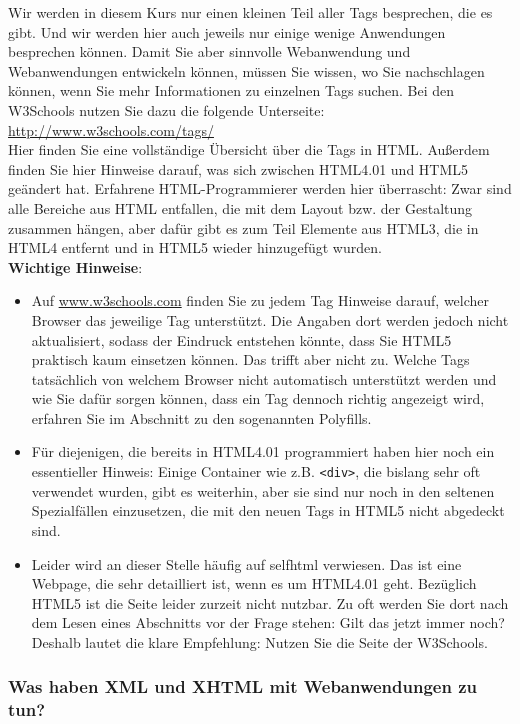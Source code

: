 Wir werden in diesem Kurs nur einen kleinen Teil aller Tags besprechen, die es gibt. Und wir werden hier auch jeweils nur einige wenige Anwendungen besprechen können. Damit Sie aber sinnvolle Webanwendung und Webanwendungen entwickeln können, müssen Sie wissen, wo Sie nachschlagen können, wenn Sie mehr Informationen zu einzelnen Tags suchen. Bei den W3Schools nutzen Sie dazu die folgende Unterseite: \url{http://www.w3schools.com/tags/}\\

Hier finden Sie eine vollständige Übersicht über die Tags in HTML. Außerdem finden Sie hier Hinweise darauf, was sich zwischen HTML4.01 und HTML5 geändert hat. Erfahrene HTML-Programmierer werden hier überrascht: Zwar sind alle Bereiche aus HTML entfallen, die mit dem Layout bzw. der Gestaltung zusammen hängen, aber dafür gibt es zum Teil Elemente aus HTML3, die in HTML4 entfernt und in HTML5 wieder hinzugefügt wurden.\\

\textbf{Wichtige Hinweise}:

\begin{itemize}
	\item Auf \url{www.w3schools.com} finden Sie zu jedem Tag Hinweise darauf, welcher Browser das jeweilige Tag unterstützt. Die Angaben dort werden jedoch nicht aktualisiert, sodass der Eindruck entstehen könnte, dass Sie HTML5 praktisch kaum einsetzen können. Das trifft aber nicht zu. Welche Tags tatsächlich von welchem Browser nicht automatisch unterstützt werden und wie Sie dafür sorgen können, dass ein Tag dennoch richtig angezeigt wird, erfahren Sie im Abschnitt zu den sogenannten Polyfills.
	\item Für diejenigen, die bereits in HTML4.01 programmiert haben hier noch ein essentieller Hinweis: Einige Container wie z.B. \verb|<div>|, die bislang sehr oft verwendet wurden, gibt es weiterhin, aber sie sind nur noch in den seltenen Spezialfällen einzusetzen, die mit den neuen Tags in HTML5 nicht abgedeckt sind.
	\item Leider wird an dieser Stelle häufig auf selfhtml verwiesen. Das ist eine Webpage, die sehr detailliert ist, wenn es um HTML4.01 geht. Bezüglich HTML5 ist die Seite leider zurzeit nicht nutzbar. Zu oft werden Sie dort nach dem Lesen eines Abschnitts vor der Frage stehen: Gilt das jetzt immer noch? Deshalb lautet die klare Empfehlung: Nutzen Sie die Seite der W3Schools.
\end{itemize}

\subsubsection{Was haben XML und XHTML mit Webanwendungen zu tun?}

